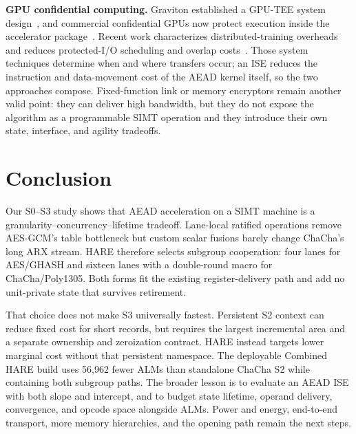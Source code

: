 \documentclass[conference]{IEEEtran}
\begin{document}
\textbf{GPU confidential computing.} Graviton established a GPU-TEE system
design~\cite{volos2018graviton}, and commercial confidential GPUs now protect
execution inside the accelerator package~\cite{nvidia-h100-cc}. Recent work
characterizes distributed-training overheads and reduces protected-I/O
scheduling and overlap costs~\cite{lee2025gputee,wang2024fastrack}. Those
system techniques determine when and where transfers occur; an ISE reduces
the instruction and data-movement cost of the AEAD kernel itself, so the two
approaches compose. Fixed-function link or memory encryptors remain another
valid point: they can deliver high bandwidth, but they do not expose the
algorithm as a programmable SIMT operation and they introduce their own
state, interface, and agility tradeoffs.

\section{Conclusion}\label{sec:conclusion}
Our S0--S3 study shows that AEAD acceleration on a SIMT machine is a
granularity--concurrency--lifetime tradeoff. Lane-local ratified operations
remove AES-GCM's table bottleneck but custom scalar fusions barely change
ChaCha's long ARX stream. HARE therefore selects subgroup cooperation: four
lanes for AES/GHASH and sixteen lanes with a double-round macro for
ChaCha/Poly1305. Both forms fit the existing register-delivery path and add no
unit-private state that survives retirement.

That choice does not make S3 universally fastest. Persistent S2 context can
reduce fixed cost for short records, but requires the largest incremental area
and a separate ownership and zeroization contract. HARE instead targets lower
marginal cost without that persistent namespace. The deployable Combined HARE build uses
56{,}962 fewer ALMs than standalone ChaCha S2 while containing both
subgroup paths. The broader lesson is to evaluate
an AEAD ISE with both slope and intercept, and to budget state lifetime,
operand delivery, convergence, and opcode space alongside ALMs. Power and
energy, end-to-end transport, more memory hierarchies, and the opening path remain the
next steps.

\balance


\end{document}
